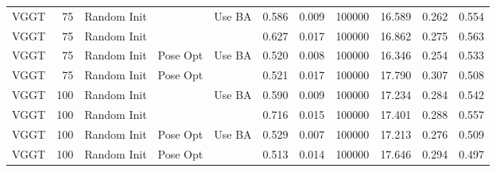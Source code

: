 \begin{table}[H]
\begin{tabular}{lrlllrrrrrr}
VGGT & 75 & Random Init &  & Use BA & 0.586 & 0.009 & 100000 & 16.589 & 0.262 & 0.554 \\
VGGT & 75 & Random Init &  &  & 0.627 & 0.017 & 100000 & 16.862 & 0.275 & 0.563 \\
VGGT & 75 & Random Init & Pose Opt & Use BA & 0.520 & 0.008 & 100000 & 16.346 & 0.254 & 0.533 \\
VGGT & 75 & Random Init & Pose Opt &  & 0.521 & 0.017 & 100000 & 17.790 & 0.307 & 0.508 \\
VGGT & 100 & Random Init &  & Use BA & 0.590 & 0.009 & 100000 & 17.234 & 0.284 & 0.542 \\
VGGT & 100 & Random Init &  &  & 0.716 & 0.015 & 100000 & 17.401 & 0.288 & 0.557 \\
VGGT & 100 & Random Init & Pose Opt & Use BA & 0.529 & 0.007 & 100000 & 17.213 & 0.276 & 0.509 \\
VGGT & 100 & Random Init & Pose Opt &  & 0.513 & 0.014 & 100000 & 17.646 & 0.294 & 0.497 \\
\bottomrule
\end{tabular}
\end{table}